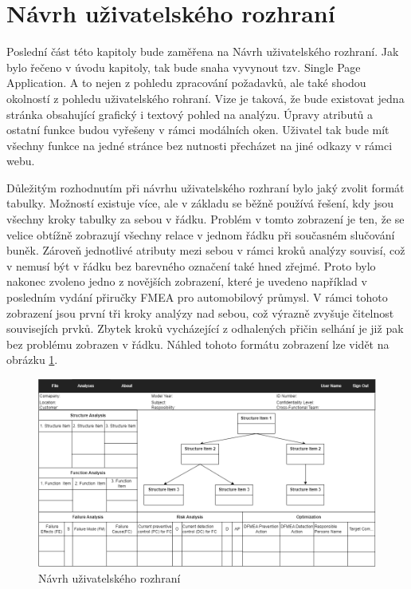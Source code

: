 \section{Návrh uživatelského rozhraní}
Poslední část této kapitoly bude zaměřena na Návrh uživatelského rozhraní. Jak bylo řečeno v úvodu kapitoly, tak bude snaha vyvynout tzv. Single Page Application. A to nejen z pohledu zpracování požadavků, ale také shodou okolností z pohledu uživatelského rohraní. Vize je taková, že bude existovat jedna stránka obsahující grafický i textový pohled na analýzu. Úpravy atributů a ostatní funkce budou vyřešeny v rámci modálních oken. Uživatel tak bude mít všechny funkce na jedné stránce bez nutnosti přecházet na jiné odkazy v rámci webu. 

Důležitým rozhodnutím při návrhu uživatelského rozhraní bylo jaký zvolit formát tabulky. Možností existuje více, ale v základu se běžně používá řešení, kdy jsou všechny kroky tabulky za sebou v řádku. Problém v tomto zobrazení je ten, že se velice obtížně zobrazují všechny relace v jednom řádku při současném slučování buněk. Zároveň jednotlivé atributy mezi sebou v rámci kroků analýzy souvisí, což v nemusí být v řádku bez barevného označení také hned zřejmé. Proto bylo nakonec zvoleno jedno z novějších zobrazení, které je uvedeno například v posledním vydání přiručky FMEA pro automobilový průmysl.\cite{handbookExample} V rámci tohoto zobrazení jsou první tři kroky analýzy nad sebou, což výrazně zvyšuje čitelnost souvisejích prvků. Zbytek kroků vycházející z odhalených přičin selhání je již pak bez problému zobrazen v řádku. Náhled tohoto formátu zobrazení lze vidět na obrázku \ref{fig:ui}.

\begin{figure}[h]
\centering
	\includegraphics[width=1.0\textwidth]{Figures/mockup3.png}
	\caption{Návrh uživatelského rozhraní }
	\label{fig:ui}
\end{figure}